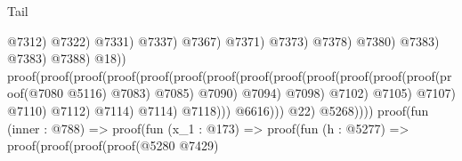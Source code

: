 \begin{lexlean}{Tail}
\begin{coremodule}
                                                                                    @7312)
                                                                                  @7322)
                                                                                @7331)
                                                                              @7337)
                                                                            @7367)
                                                                          @7371)
                                                                        @7373)
                                                                      @7378)
                                                                    @7380)
                                                                  @7383)
                                                                @7383)
                                                              @7388)
                                                            @18))
                                                      proof(proof(proof(proof(proof(proof(proof(proof(proof(proof(proof(proof(proof(proof(@7080
                                                                                    @5116)
                                                                                  @7083)
                                                                                @7085)
                                                                              @7090)
                                                                            @7094)
                                                                          @7098)
                                                                        @7102)
                                                                      @7105)
                                                                    @7107)
                                                                  @7110)
                                                                @7112)
                                                              @7114)
                                                            @7114)
                                                          @7118)))
                                                @6616)))
                                        @22)
                                      @5268))))
                            proof(fun (inner : @788) =>
                              proof(fun (x_1 : @173) =>
                                proof(fun (h : @5277) =>
                                  proof(proof(proof(proof(@5280 @7429)

\end{coremodule}
\end{lexlean}
